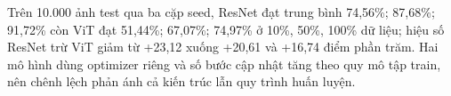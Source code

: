 Trên 10.000 ảnh test qua ba cặp seed, ResNet đạt trung bình 74,56\%; 87,68\%; 91,72\% còn ViT đạt 51,44\%; 67,07\%; 74,97\% ở 10\%, 50\%, 100\% dữ liệu; hiệu số ResNet trừ ViT giảm từ +23,12 xuống +20,61 và +16,74 điểm phần trăm. Hai mô hình dùng optimizer riêng và số bước cập nhật tăng theo quy mô tập train, nên chênh lệch phản ánh cả kiến trúc lẫn quy trình huấn luyện.

